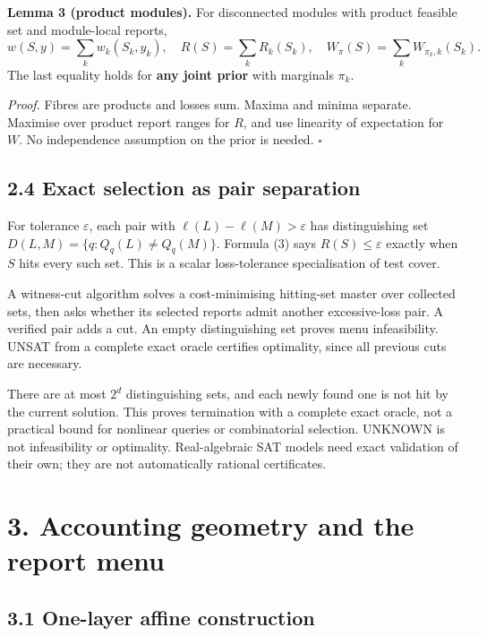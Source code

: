 \documentclass[
  british,
  11pt,
  a4paper,
]{article}
\begin{document}
\textbf{Lemma 3 (product modules).} For disconnected modules with
product feasible set and module-local reports, \[
w(S,y)=\sum_k w_k(S_k,y_k),\quad
R(S)=\sum_k R_k(S_k),\quad
W_\pi(S)=\sum_kW_{\pi_k,k}(S_k).
\tag{6}
\] The last equality holds for \textbf{any joint prior} with marginals
\(\pi_k\).

\emph{Proof.} Fibres are products and losses sum. Maxima and minima
separate. Maximise over product report ranges for \(R\), and use
linearity of expectation for \(W\). No independence assumption on the
prior is needed. \(\square\)

\subsection{2.4 Exact selection as pair
separation}\label{exact-selection-as-pair-separation}

For tolerance \(\varepsilon\), each pair with
\(\ell(L)-\ell(M)>\varepsilon\) has distinguishing set
\(D(L,M)=\{q:Q_q(L)\ne Q_q(M)\}\). Formula (3) says
\(R(S)\le\varepsilon\) exactly when \(S\) hits every such set. This is a
scalar loss-tolerance specialisation of test cover.

A witness-cut algorithm solves a cost-minimising hitting-set master over
collected sets, then asks whether its selected reports admit another
excessive-loss pair. A verified pair adds a cut. An empty distinguishing
set proves menu infeasibility. UNSAT from a complete exact oracle
certifies optimality, since all previous cuts are necessary.

There are at most \(2^d\) distinguishing sets, and each newly found one
is not hit by the current solution. This proves termination with a
complete exact oracle, not a practical bound for nonlinear queries or
combinatorial selection. UNKNOWN is not infeasibility or optimality.
Real-algebraic SAT models need exact validation of their own; they are
not automatically rational certificates.

\section{3. Accounting geometry and the report
menu}\label{accounting-geometry-and-the-report-menu}

\subsection{3.1 One-layer affine
construction}\label{one-layer-affine-construction}
\end{document}
